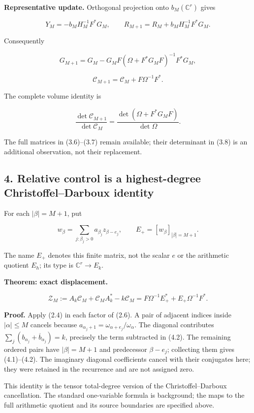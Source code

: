 \documentclass[
]{article}
\begin{document}
\textbf{Representative update.} Orthogonal projection onto
\(b_M(\mathbb C^r)\) gives

\[\boxed{Y_M=-b_MH_M^{-1}F^*G_M,\qquad R_{M+1}=R_M+b_MH_M^{-1}F^*G_M.}\tag{3.5}\]

Consequently

\[\boxed{G_{M+1}=G_M-G_MF(\Omega+F^*G_MF)^{-1}F^*G_M,}\tag{3.6}\]

\[\boxed{\mathcal C_{M+1}=\mathcal C_M+F\Omega^{-1}F^*.}\tag{3.7}\]

The complete volume identity is

\[\frac{\det\mathcal C_{M+1}}{\det\mathcal C_M}
=\frac{\det(\Omega+F^*G_MF)}{\det\Omega}.\tag{3.8}\]

The full matrices in (3.6)--(3.7) remain available; their determinant in
(3.8) is an additional observation, not their replacement.

\subsection{4. Relative control is a highest-degree Christoffel--Darboux
identity}\label{relative-control-is-a-highest-degree-christoffeldarboux-identity}

For each \(|\beta|=M+1\), put

\[w_\beta=\sum_{j:\beta_j>0}a_{\beta_j}z_{\beta-e_j},\qquad
E_+=[w_\beta]_{|\beta|=M+1}.\tag{4.1}\]

The name \(E_+\) denotes this finite matrix, not the scalar \(e\) or the
arithmetic quotient \(E_h\); its type is \(\mathbb C^r\to E_k\).

\textbf{Theorem: exact displacement.}

\[\boxed{\mathcal Z_M:=A_k\mathcal C_M+\mathcal C_MA_k^*-k\mathcal C_M
=F\Omega^{-1}E_+^*+E_+\Omega^{-1}F^*.}\tag{4.2}\]

\textbf{Proof.} Apply (2.4) in each factor of (2.6). A pair of adjacent
indices inside \(|\alpha|\le M\) cancels because
\(a_{\alpha_j+1}=\omega_{\alpha+e_j}/\omega_\alpha\). The diagonal
contributes \(\sum_j(b_{\alpha_j}+\overline b_{\alpha_j})=k\), precisely
the term subtracted in (4.2). The remaining ordered pairs have
\(|\beta|=M+1\) and predecessor \(\beta-e_j\); collecting them gives
(4.1)--(4.2). The imaginary diagonal coefficients cancel with their
conjugates here; they were retained in the recurrence and are not
assigned zero.

This identity is the tensor total-degree version of the
Christoffel--Darboux cancellation. The standard one-variable formula is
background; the maps to the full arithmetic quotient and its source
boundaries are specified above.
\end{document}
